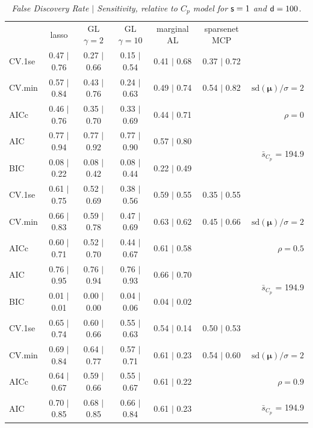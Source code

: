 \documentclass[12pt]{article}
\newcommand{\mr}[1]{\mathrm{#1}}
\newcommand{\bm}[1]{\mathbf{#1}}
\begin{document}
\begin{table}[p]\vspace{-.5cm}
\caption[l]{\it False Discovery Rate $\mid$ Sensitivity, relative to $C_p$ model  for ${\sf s}=1$ and ${\sf d}=100$.}
\vspace{-.5cm}
\small{}
\begin{center}
\begin{tabular}{l*{5}{c}|r}
 & lasso & GL $\gamma=2$ & GL $\gamma=10$ & marginal AL & sparsenet MCP  & \\
 \cline{1-7}
CV.1se & 0.47 $\mid$ 0.76 & 0.27 $\mid$ 0.66 & 0.15 $\mid$ 0.54 & 0.41 $\mid$ 0.68 & 0.37 $\mid$ 0.72 &\\
CV.min & 0.57 $\mid$ 0.84 & 0.43 $\mid$ 0.76 & 0.24 $\mid$ 0.63 & 0.49 $\mid$ 0.74 & 0.54 $\mid$ 0.82 &  $\mr{sd}(\bm{\mu})/\sigma=2$ \\
AICc & 0.46 $\mid$ 0.76 & 0.35 $\mid$ 0.70 & 0.33 $\mid$ 0.69 & 0.44 $\mid$ 0.71 & & $\rho=0$ \\
AIC & 0.77 $\mid$ 0.94 & 0.77 $\mid$ 0.92 & 0.77 $\mid$ 0.90 & 0.57 $\mid$ 0.80 & & \multirow{2}{*}{$\bar{s}_{C_p}$ = 194.9} \\
BIC & 0.08 $\mid$ 0.22 & 0.08 $\mid$ 0.42 & 0.08 $\mid$ 0.44 & 0.22 $\mid$ 0.49 & & \\
 \hline 
CV.1se & 0.61 $\mid$ 0.75 & 0.52 $\mid$ 0.69 & 0.38 $\mid$ 0.56 & 0.59 $\mid$ 0.55 & 0.35 $\mid$ 0.55 &\\
CV.min & 0.66 $\mid$ 0.83 & 0.59 $\mid$ 0.78 & 0.47 $\mid$ 0.69 & 0.63 $\mid$ 0.62 & 0.45 $\mid$ 0.66 &  $\mr{sd}(\bm{\mu})/\sigma=2$ \\
AICc & 0.60 $\mid$ 0.71 & 0.52 $\mid$ 0.70 & 0.44 $\mid$ 0.67 & 0.61 $\mid$ 0.58 & & $\rho=0.5$ \\
AIC & 0.76 $\mid$ 0.95 & 0.76 $\mid$ 0.94 & 0.76 $\mid$ 0.93 & 0.66 $\mid$ 0.70 & & \multirow{2}{*}{$\bar{s}_{C_p}$ = 194.9} \\
BIC & 0.01 $\mid$ 0.01 & 0.00 $\mid$ 0.00 & 0.04 $\mid$ 0.06 & 0.04 $\mid$ 0.02 & & \\
 \hline 
CV.1se & 0.65 $\mid$ 0.74 & 0.60 $\mid$ 0.66 & 0.55 $\mid$ 0.63 & 0.54 $\mid$ 0.14 & 0.50 $\mid$ 0.53 &\\
CV.min & 0.69 $\mid$ 0.84 & 0.64 $\mid$ 0.77 & 0.57 $\mid$ 0.71 & 0.61 $\mid$ 0.23 & 0.54 $\mid$ 0.60 &  $\mr{sd}(\bm{\mu})/\sigma=2$ \\
AICc & 0.64 $\mid$ 0.67 & 0.59 $\mid$ 0.66 & 0.55 $\mid$ 0.67 & 0.61 $\mid$ 0.22 & & $\rho=0.9$ \\
AIC & 0.70 $\mid$ 0.85 & 0.68 $\mid$ 0.85 & 0.66 $\mid$ 0.84 & 0.61 $\mid$ 0.23 & & \multirow{2}{*}{$\bar{s}_{C_p}$ = 194.9} \\

\end{tabular}
\end{center}
\end{table}
\end{document}
